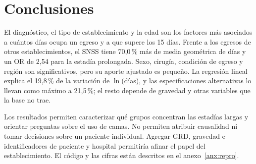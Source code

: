 \documentclass[10.5pt,a4paper,headings=small,abstract=false,bibliography=totoc,listof=totoc]{scrartcl}
\newcommand{\pct}{\,\%}
\newcommand{\anexo}[1]{anexo~\ref{#1}}
\begin{document}
\section{Conclusiones}

El diagnóstico, el tipo de establecimiento y la edad son los factores más asociados a cuántos días ocupa un egreso y a que supere los 15 días. Frente a los egresos de otros establecimientos, el SNSS tiene 70,0\pct{} más de media geométrica de días y un OR de 2,54 para la estadía prolongada. Sexo, cirugía, condición de egreso y región son significativos, pero su aporte ajustado es pequeño. La regresión lineal explica el 19,8\pct{} de la variación de $\ln$(días), y las especificaciones alternativas lo llevan como máximo a 21,5\pct{}; el resto depende de gravedad y otras variables que la base no trae.

Los resultados permiten caracterizar qué grupos concentran las estadías largas y orientar preguntas sobre el uso de camas. No permiten atribuir causalidad ni tomar decisiones sobre un paciente individual. Agregar GRD, gravedad e identificadores de paciente y hospital permitiría afinar el papel del establecimiento. El código y las cifras están descritos en el \anexo{anx:repro}.\label{fincuerpo}
\end{document}
